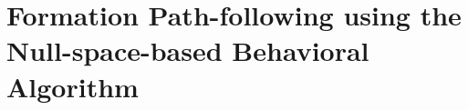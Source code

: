 \part{Formation Path-following using the Null-space-based Behavioral Algorithm}
\label{part:NSB}




